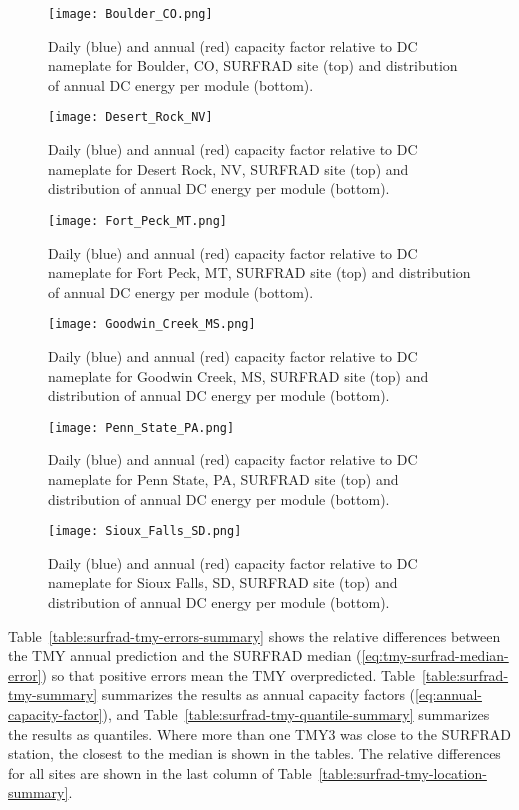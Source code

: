 \documentclass[conference]{IEEEtran}
\begin{document}
\begin{figure}[htbp]
\centerline{\texttt{[image: Boulder\_CO.png]}}
\caption{Daily (blue) and annual (red) capacity factor relative to DC nameplate for Boulder, CO, SURFRAD site (top) and distribution of annual DC energy per module (bottom).}
\label{fig:Boulder-CO}
\end{figure}

\begin{figure}[htbp]
\centerline{\texttt{[image: Desert\_Rock\_NV]}}
\caption{Daily (blue) and annual (red) capacity factor relative to DC nameplate for Desert Rock, NV, SURFRAD site (top) and distribution of annual DC energy per module (bottom).}
\label{fig:Desert-Rock-NV}
\end{figure}

\begin{figure}[htbp]
\centerline{\texttt{[image: Fort\_Peck\_MT.png]}}
\caption{Daily (blue) and annual (red) capacity factor relative to DC nameplate for Fort Peck, MT, SURFRAD site (top) and distribution of annual DC energy per module (bottom).}
\label{fig:Fort-Peck-MT}
\end{figure}

\begin{figure}[htbp]
\centerline{\texttt{[image: Goodwin\_Creek\_MS.png]}}
\caption{Daily (blue) and annual (red) capacity factor relative to DC nameplate for Goodwin Creek, MS, SURFRAD site (top) and distribution of annual DC energy per module (bottom).}
\label{fig:Goodwin-Creek-MS}
\end{figure}

\begin{figure}[htbp]
\centerline{\texttt{[image: Penn\_State\_PA.png]}}
\caption{Daily (blue) and annual (red) capacity factor relative to DC nameplate for Penn State, PA, SURFRAD site (top) and distribution of annual DC energy per module (bottom).}
\label{fig:Penn-State-PA}
\end{figure}

\begin{figure}[htbp]
\centerline{\texttt{[image: Sioux\_Falls\_SD.png]}}
\caption{Daily (blue) and annual (red) capacity factor relative to DC nameplate for Sioux Falls, SD, SURFRAD site (top) and distribution of annual DC energy per module (bottom).}
\label{fig:Sioux-Falls-SD}
\end{figure}

Table~\ref{table:surfrad-tmy-errors-summary} shows the relative differences between the TMY annual prediction and the SURFRAD median (\ref{eq:tmy-surfrad-median-error}) so that positive errors mean the TMY overpredicted. Table~\ref{table:surfrad-tmy-summary} summarizes the results as annual capacity factors (\ref{eq:annual-capacity-factor}), and Table~\ref{table:surfrad-tmy-quantile-summary} summarizes the results as quantiles. Where more than one TMY3 was close to the SURFRAD station, the closest to the median is shown in the tables. The relative differences for all sites are shown in the last column of Table~\ref{table:surfrad-tmy-location-summary}.
\end{document}
